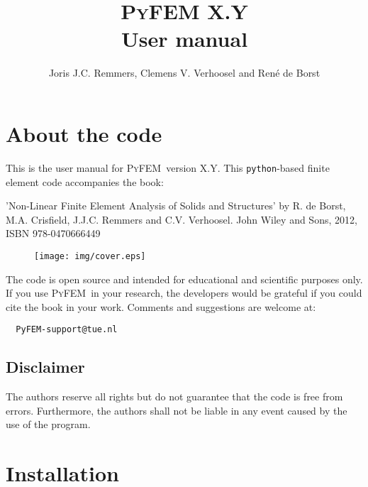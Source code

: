 \documentclass{article}
\title{\textsc{PyFEM} X.Y\\
\vspace{1cm}
User manual}
\author{Joris J.C. Remmers, Clemens V. Verhoosel and Ren\'e de Borst}
\newcommand{\progname}{\textsc{PyFEM}}
\begin{document}
\maketitle

\tableofcontents

\section{About the code}

This is the user manual for \progname~version X.Y. This \texttt{python}-based finite element code 
accompanies the book:                                              
          
\vspace{3mm}                                                       
\noindent         
'Non-Linear Finite Element Analysis of Solids and Structures' by      
 R. de Borst, M.A. Crisfield, J.J.C. Remmers and C.V. Verhoosel.        
 John Wiley and Sons, 2012, ISBN 978-0470666449                        

\begin{figure}[h]
\centering\texttt{[image: img/cover.eps]}
\end{figure}
                                                                          
\noindent
The code is open source and intended for educational and scientific     
purposes only. If you use \progname~in your research, the developers would 
be grateful if you could cite the book in your work. Comments and suggestions
are welcome at:
\begin{verbatim}
  PyFEM-support@tue.nl                                                                                                
\end{verbatim}
                                                                          
\subsection*{Disclaimer}

\noindent
The authors reserve all rights but do not guarantee that the code is    
free from errors. Furthermore, the authors shall not be liable in any   
event caused by the use of the program.                                 

\section{Installation}
\end{document}
